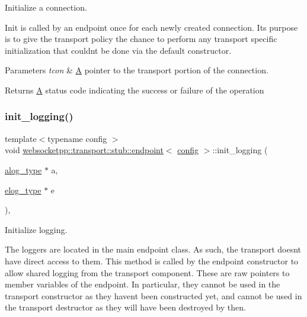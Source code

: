 Initialize a connection. 

Init is called by an endpoint once for each newly created connection. It\textquotesingle{}s purpose is to give the transport policy the chance to perform any transport specific initialization that couldn\textquotesingle{}t be done via the default constructor.


\begin{DoxyParams}{Parameters}
{\em tcon} & \mbox{\hyperlink{struct_a}{A}} pointer to the transport portion of the connection. \\
\hline
\end{DoxyParams}
\begin{DoxyReturn}{Returns}
\mbox{\hyperlink{struct_a}{A}} status code indicating the success or failure of the operation 
\end{DoxyReturn}
\mbox{\label{classwebsocketpp_1_1transport_1_1stub_1_1endpoint_ad64a58ebd03fe9e55d19ec8d27bcaac9}} 
\subsubsection{\texorpdfstring{init\+\_\+logging()}{init\_logging()}}
{\footnotesize\ttfamily template$<$typename config $>$ \\
void \mbox{\hyperlink{classwebsocketpp_1_1transport_1_1stub_1_1endpoint}{websocketpp\+::transport\+::stub\+::endpoint}}$<$ \mbox{\hyperlink{classconfig}{config}} $>$\+::init\+\_\+logging (\begin{DoxyParamCaption}\item[{\mbox{\hyperlink{classwebsocketpp_1_1transport_1_1stub_1_1endpoint_aa62a4dd626d9b8757972c0ef66e72419}{alog\+\_\+type}} $\ast$}]{a,  }\item[{\mbox{\hyperlink{classwebsocketpp_1_1transport_1_1stub_1_1endpoint_a7890584ddff40571589f62c52bc5b080}{elog\+\_\+type}} $\ast$}]{e }\end{DoxyParamCaption})\hspace{0.3cm}{\ttfamily [inline]}, {\ttfamily [protected]}}



Initialize logging. 

The loggers are located in the main endpoint class. As such, the transport doesn\textquotesingle{}t have direct access to them. This method is called by the endpoint constructor to allow shared logging from the transport component. These are raw pointers to member variables of the endpoint. In particular, they cannot be used in the transport constructor as they haven\textquotesingle{}t been constructed yet, and cannot be used in the transport destructor as they will have been destroyed by then.



